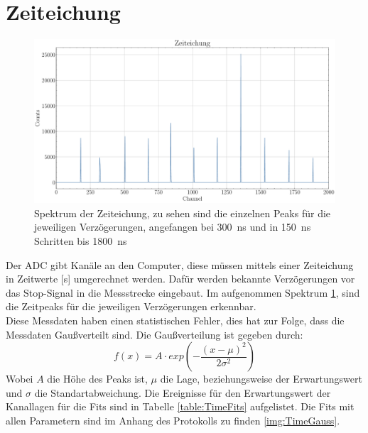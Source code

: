 \documentclass[12pt,a4paper,ngerman]{report}
\begin{document}
	\section{Zeiteichung}
	\begin{figure}[ht]
		\centering
		\includegraphics[width=\textwidth]{Bilder/zeitEich.pdf}		
		\caption{Spektrum der Zeiteichung, zu sehen sind die einzelnen Peaks für die jeweiligen Verzögerungen, angefangen bei \SI{300}{\nano \s} und in \SI{150}{\nano \s} Schritten bis \SI{1800}{\nano \s}}
		\label{img:zeitEich}
	\end{figure}
	Der ADC gibt Kanäle an den Computer, diese müssen mittels einer Zeiteichung in Zeitwerte [s] umgerechnet werden. Dafür werden bekannte Verzögerungen vor das Stop-Signal in die Messstrecke eingebaut. Im aufgenommen Spektrum \ref{img:zeitEich}, sind die Zeitpeaks für die jeweiligen Verzögerungen erkennbar.\\
	Diese Messdaten haben einen statistischen Fehler, dies hat zur Folge, dass die Messdaten Gaußverteilt sind. Die Gaußverteilung ist gegeben durch:
	\begin{equation}
		f(x) = A \cdot exp\left(- \frac{(x-\mu)^2}{2 \sigma ^2}\right)
	\end{equation}
	Wobei $A$ die Höhe des Peaks ist, $\mu$ die Lage, beziehungsweise der Erwartungswert und $\sigma$ die Standartabweichung. Die Ereignisse für den Erwartungswert der Kanallagen für die Fits sind in Tabelle \ref{table:TimeFits} aufgelistet. Die Fits mit allen Parametern sind im Anhang des Protokolls zu finden \ref{img:TimeGauss}.
\end{document}
